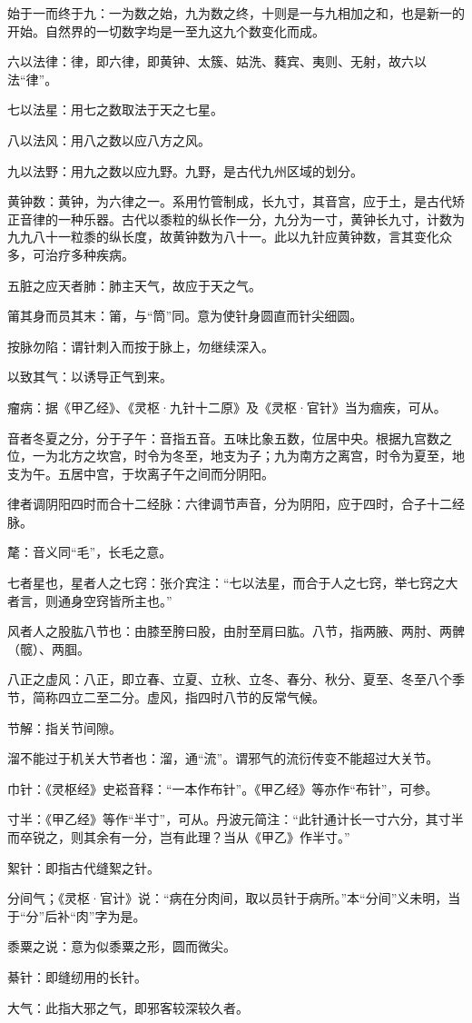 \documentclass[12pt]{ctexbook}%
\begin{document}
\begin{jiaozhu}
  \item 始于一而终于九：一为数之始，九为数之终，十则是一与九相加之和，也是新一的开始。自然界的一切数字均是一至九这九个数变化而成。
  \item 六以法律：律，即六律，即黄钟、太簇、姑洗、蕤宾、夷则、无射，故六以法“律”。
  \item 七以法星：用七之数取法于天之七星。
  \item 八以法风：用八之数以应八方之风。
  \item 九以法野：用九之数以应九野。九野，是古代九州区域的划分。
  \item 黄钟数：黄钟，为六律之一。系用竹管制成，长九寸，其音宫，应于土，是古代矫正音律的一种乐器。古代以黍粒的纵长作一分，九分为一寸，黄钟长九寸，计数为九九八十一粒黍的纵长度，故黄钟数为八十一。此以九针应黄钟数，言其变化众多，可治疗多种疾病。
  \item 五脏之应天者肺：肺主天气，故应于天之气。
  \item 𥮉其身而员其末：𥮉，与“筒”同。意为使针身圆直而针尖细圆。
  \item 按脉勿陷：谓针刺入而按于脉上，勿继续深入。
  \item 以致其气：以诱导正气到来。
  \item 瘤病：据《甲乙经》、《灵枢·九针十二原》及《灵枢·官针》当为痼疾，可从。
  \item 音者冬夏之分，分于子午：音指五音。五味比象五数，位居中央。根据九宫数之位，一为北方之坎宫，时令为冬至，地支为子；九为南方之离宫，时令为夏至，地支为午。五居中宫，于坎离子午之间而分阴阳。
  \item 律者调阴阳四时而合十二经脉：六律调节声音，分为阴阳，应于四时，合子十二经脉。
  \item 氂：音义同“毛”，长毛之意。
  \item 七者星也，星者人之七窍：张介宾注：“七以法星，而合于人之七窍，举七窍之大者言，则通身空窍皆所主也。”
  \item 风者人之股肱八节也：由膝至胯曰股，由肘至肩曰肱。八节，指两腋、两肘、两髀（髋）、两腘。
  \item 八正之虚风：八正，即立春、立夏、立秋、立冬、春分、秋分、夏至、冬至八个季节，简称四立二至二分。虚风，指四时八节的反常气候。
  \item 节解：指关节间隙。
  \item 溜不能过于机关大节者也：溜，通“流”。谓邪气的流衍传变不能超过大关节。
  \item 巾针：《灵枢经》史崧音释：“一本作布针”。《甲乙经》等亦作“布针”，可参。
  \item 寸半：《甲乙经》等作“半寸”，可从。丹波元简注：“此针通计长一寸六分，其寸半而卒锐之，则其余有一分，岂有此理？当从《甲乙》作半寸。”
  \item 絮针：即指古代缝絮之针。
  \item 分间气；《灵枢·官计》说：“病在分肉间，取以员针于病所。”本“分间”义未明，当于“分”后补“肉”字为是。
  \item 黍粟之说：意为似黍粟之形，圆而微尖。
  \item 綦针：即缝纫用的长针。
  \item 大气：此指大邪之气，即邪客较深较久者。
\end{jiaozhu}
\end{document}
